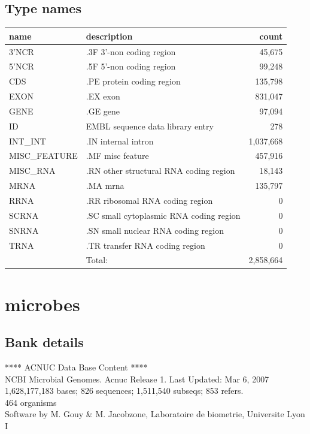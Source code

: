 \documentclass{article}
\begin{document}
\begin{Schunk}
\subsection{Type names}
\noindent\begin{tabular}{llr}
\hline \hline
name & description & count \\
\hline
3'NCR  &  .3F  3'-non coding region  &  45,675 \\
5'NCR  &  .5F  5'-non coding region  &  99,248 \\
CDS  &  .PE protein coding region  &  135,798 \\
EXON  &  .EX exon  &  831,047 \\
GENE  &  .GE gene  &  97,094 \\
ID  &  EMBL sequence data library entry  &  278 \\
INT\_INT  &  .IN  internal intron  &  1,037,668 \\
MISC\_FEATURE  &  .MF misc feature  &  457,916 \\
MISC\_RNA  &  .RN other structural RNA coding region  &  18,143 \\
MRNA  &  .MA mrna  &  135,797 \\
RRNA  &  .RR ribosomal RNA coding region  &  0 \\
SCRNA  &  .SC small cytoplasmic RNA coding region  &  0 \\
SNRNA  &  .SN small nuclear RNA coding region  &  0 \\
TRNA  &  .TR transfer RNA coding region  &  0 \\
\hline
 & Total: & 2,858,664 \\
\hline \hline
\end{tabular}

\section{ microbes }
\subsection{Bank details}
             ****     ACNUC Data Base Content      ****                         \\
       NCBI Microbial Genomes. Acnuc Release 1. Last Updated: Mar  6, 2007\\
1,628,177,183 bases; 826 sequences; 1,511,540 subseqs; 853 refers.\\
464 organisms\\
Software by M. Gouy \& M. Jacobzone, Laboratoire de biometrie, Universite Lyon I 


\end{Schunk}
\end{document}
